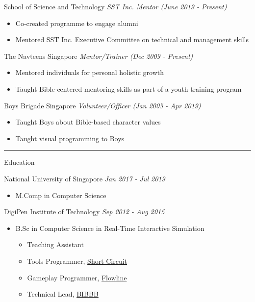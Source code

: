 \documentclass[letterpaper,11pt]{article}
\newcommand{\cvtitle}[1]{\huge\raggedright \textcolor{section_color}{#1}\\}
\newcommand{\cvhead}[1]{\large\raggedright \textcolor{subsection_color}{#1}\\}
\newcommand{\cvlist}[1]{\vspace{-12pt}\small \textcolor{item_color}{\begin{itemize}#1\end{itemize}}}
\newcommand{\cvli}[1]{\vspace{-4pt} \item{#1}}
\newcommand{\cvline}[0]{\noindent\rule{19cm}{0.4pt}}
\newcommand{\link}[2]{\textcolor{link_color}{\href{#1}{#2}}}
\newcommand{\qualifier}[1]{\hfill \textsl{\footnotesize #1}}
\begin{document}
\cvhead{School of Science and Technology \qualifier{SST Inc. Mentor (June 2019 - Present)}}
\cvlist{
    \cvli{Co-created programme to engage alumni}
    \cvli{Mentored SST Inc. Executive Committee on technical and management skills}
}

\cvhead{The Navteens Singapore \qualifier{Mentor/Trainer (Dec 2009 - Present)}}
\cvlist{
    \cvli{Mentored individuals for personal holistic growth}
    \cvli{Taught Bible-centered mentoring skills as part of a youth training program}
}

\cvhead{Boys Brigade Singapore \qualifier{Volunteer/Officer (Jan 2005 - Apr 2019)}}
\cvlist{
    \cvli{Taught Boys about Bible-based character values}
    \cvli{Taught visual programming to Boys}
}

\vspace{-12pt}

\cvline

\cvtitle{Education}
\cvhead{National University of Singapore \qualifier{Jan 2017 - Jul 2019}}
\cvlist{
    \cvli{
        \cvhead{M.Comp in Computer Science}
    }
}

\cvhead{DigiPen Institute of Technology \qualifier{Sep 2012 - Aug 2015}}
\cvlist{
    \cvli{
        \cvhead{B.Sc in Computer Science in Real-Time Interactive Simulation}
        \cvlist{
            \cvli{Teaching Assistant}
            \cvli{Tools Programmer, \link{http://games.digipen.edu/games/shortcircuit}{Short Circuit}}
            \cvli{Gameplay Programmer, \link{http://games.digipen.edu/games/flowline}{Flowline}}
            \cvli{Technical Lead, \link{http://games.digipen.edu/games/bibbb}{BIBBB}}
        }
    }
}
\end{document}
